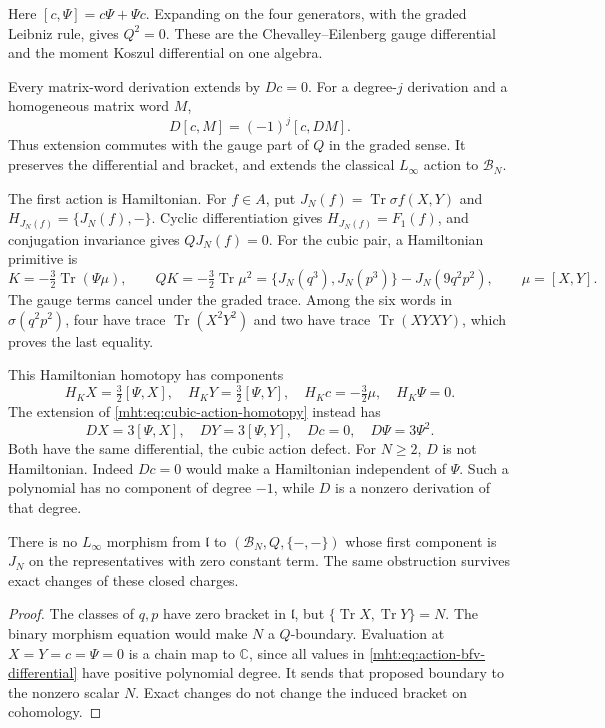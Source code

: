 Here $[c,\Psi]=c\Psi+\Psi c$. Expanding on the four
generators, with the graded Leibniz rule, gives $Q^2=0$.
These are the Chevalley--Eilenberg gauge differential and
the moment Koszul differential on one algebra.

Every matrix-word derivation extends by $Dc=0$. For a
degree-$j$ derivation and a homogeneous matrix word $M$,
\[
 D[c,M]=(-1)^j[c,DM].
\]
Thus extension commutes with the gauge part of $Q$ in the
graded sense. It preserves the differential and bracket,
and extends the classical $L_\infty$ action to $\mathcal B_N$.

The first action is Hamiltonian. For $f\in A$, put
$J_N(f)=\operatorname{Tr}\sigma f(X,Y)$ and
$H_{J_N(f)}=\{J_N(f),-\}$. Cyclic differentiation gives
$H_{J_N(f)}=F_1(f)$, and conjugation invariance gives
$QJ_N(f)=0$. For the cubic pair, a Hamiltonian primitive is
\begin{equation}\label{mht:eq:hamiltonian-cubic-primitive}
 K=-\tfrac32\operatorname{Tr}(\Psi\mu),\qquad
 QK=-\tfrac32\operatorname{Tr}\mu^2
    =\{J_N(q^3),J_N(p^3)\}-J_N(9q^2p^2),
 \qquad \mu=[X,Y].
\end{equation}
The gauge terms cancel under the graded trace. Among the six
words in $\sigma(q^2p^2)$, four have trace
$\operatorname{Tr}(X^2Y^2)$ and two have trace
$\operatorname{Tr}(XYXY)$, which proves the last equality.

This Hamiltonian homotopy has components
\[
 H_KX=\tfrac32[\Psi,X],\quad
 H_KY=\tfrac32[\Psi,Y],\quad
 H_Kc=-\tfrac32\mu,\quad H_K\Psi=0.
\]
The extension of \eqref{mht:eq:cubic-action-homotopy} instead has
\[
 DX=3[\Psi,X],\quad DY=3[\Psi,Y],\quad
 Dc=0,\quad D\Psi=3\Psi^2.
\]
Both have the same differential, the cubic action defect.
For $N\geq2$, $D$ is not Hamiltonian. Indeed $Dc=0$ would
make a Hamiltonian independent of $\Psi$. Such a polynomial
has no component of degree $-1$, while $D$ is a nonzero
derivation of that degree.

\begin{proposition}\label{mht:prop:central-action-obstruction}
There is no $L_\infty$ morphism from $\mathfrak l$ to
$(\mathcal B_N,Q,\{-,-\})$ whose first component is $J_N$
on the representatives with zero constant term. The same
obstruction survives exact changes of these closed charges.
\end{proposition}

\begin{proof}
The classes of $q,p$ have zero bracket in $\mathfrak l$, but
$\{\operatorname{Tr}X,\operatorname{Tr}Y\}=N$.
The binary morphism equation would make $N$ a $Q$-boundary.
Evaluation at $X=Y=c=\Psi=0$ is a chain map to $\mathbb C$,
since all values in \eqref{mht:eq:action-bfv-differential}
have positive polynomial degree. It sends that proposed
boundary to the nonzero scalar $N$. Exact changes do not
change the induced bracket on cohomology.
\end{proof}

